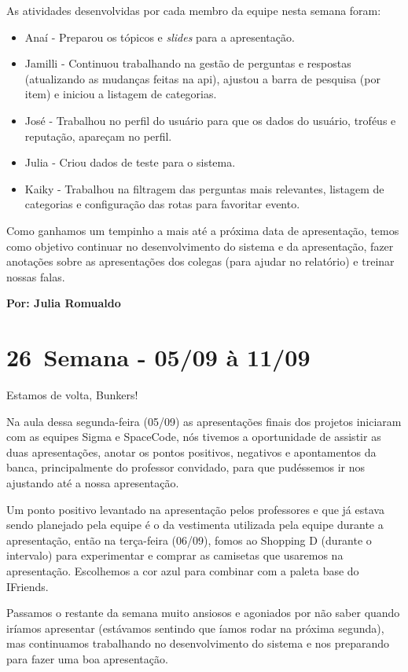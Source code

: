 As atividades desenvolvidas por cada membro da equipe nesta semana foram:

\begin{itemize}
    \item Anaí - Preparou os tópicos e \textit{slides} para a apresentação.
    \item Jamilli - Continuou trabalhando na gestão de perguntas e respostas (atualizando as mudanças feitas na \acs{api}), ajustou a barra de pesquisa (por item) e iniciou a listagem de categorias.
    \item José - Trabalhou no perfil do usuário para que os dados do usuário, troféus e reputação, apareçam no perfil.
    \item Julia - Criou dados de teste para o sistema. 
    \item Kaiky - Trabalhou na filtragem das perguntas mais relevantes, listagem de categorias e configuração das rotas para favoritar evento.
\end{itemize}

Como ganhamos um tempinho a mais até a próxima data de apresentação, temos como objetivo continuar no desenvolvimento do sistema e da apresentação, fazer anotações sobre as apresentações dos colegas (para ajudar no relatório) e treinar nossas falas.

\textbf{Por: Julia Romualdo}

\section{26\textordfeminine \, Semana - 05/09 à 11/09}
Estamos de volta, Bunkers!

Na aula dessa segunda-feira (05/09) as apresentações finais dos projetos iniciaram com as equipes Sigma e SpaceCode, nós tivemos a oportunidade de assistir as duas apresentações, anotar os pontos positivos, negativos e apontamentos da banca, principalmente do professor convidado, para que pudéssemos ir nos ajustando até a nossa apresentação.

Um ponto positivo levantado na apresentação pelos professores e que já estava sendo planejado pela equipe é o da vestimenta utilizada pela equipe durante a apresentação, então na terça-feira (06/09), fomos ao Shopping D (durante o intervalo) para experimentar e comprar as camisetas que usaremos na apresentação. Escolhemos a cor azul para combinar com a paleta base do IFriends.

Passamos o restante da semana muito ansiosos e agoniados por não saber quando iríamos apresentar (estávamos sentindo que íamos rodar na próxima segunda), mas continuamos trabalhando no desenvolvimento do sistema e nos preparando para fazer uma boa apresentação. 

